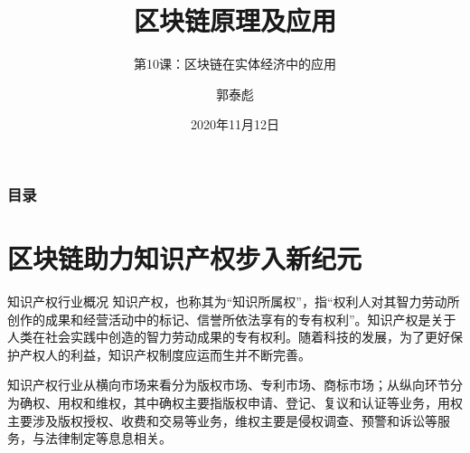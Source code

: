 \documentclass[11pt]{beamer}
\author{郭泰彪}
\title{区块链原理及应用}
\subtitle{第10课：区块链在实体经济中的应用}
\institute[湖工商大数据研究院]{湖南工商大学大数据与互联网创新研究院}
\date{2020年11月12日}
\begin{document}
\begin{frame}
	\maketitle
\end{frame}

\begin{frame}
	\frametitle{目录}
	\tableofcontents[sectionstyle=show,subsectionstyle=show/shaded]
\end{frame}

\section{区块链助力知识产权步入新纪元}


\begin{frame}{知识产权行业概况}
	知识产权，也称其为“知识所属权”，指“权利人对其智力劳动所创作的成果和经营活动中的标记、信誉所依法享有的专有权利”。知识产权是关于人类在社会实践中创造的智力劳动成果的专有权利。随着科技的发展，为了更好保护产权人的利益，知识产权制度应运而生并不断完善。

	知识产权行业从横向市场来看分为版权市场、专利市场、商标市场；从纵向环节分为确权、用权和维权，其中确权主要指版权申请、登记、复议和认证等业务，用权主要涉及版权授权、收费和交易等业务，维权主要是侵权调查、预警和诉讼等服务，与法律制定等息息相关。
\end{frame}
\end{document}

